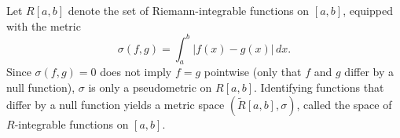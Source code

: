 Let $R[a,b]$ denote the set of Riemann-integrable functions on $[a,b]$, equipped with the metric
$$\sigma(f, g) = \int_a^b |f(x) - g(x)| \, dx.$$
Since $\sigma(f,g) = 0$ does not imply $f = g$ pointwise (only that $f$ and $g$ differ by a null function), $\sigma$ is only a pseudometric on $R[a,b]$. Identifying functions that differ by a null function yields a metric space $(\tilde{R}[a,b], \sigma)$, called the space of $R$-integrable functions on $[a,b]$.
